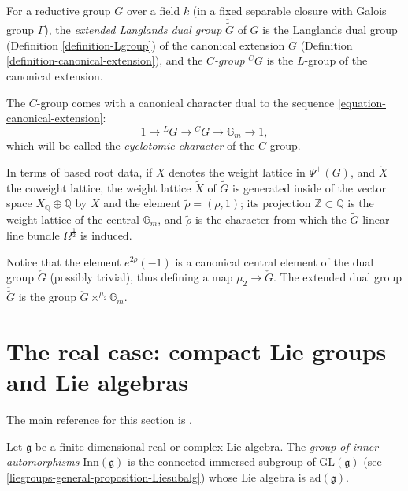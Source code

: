 \begin{definition}
 \label{definition-C-group}
For a reductive group $G$ over a field $k$ (in a fixed separable closure with Galois group $\Gamma$), the {\it extended Langlands dual group} $\check{\tilde G}$ of $G$ is the Langlands dual group (Definition \ref{definition-Lgroup}) of the canonical extension $\tilde G$ (Definition \ref{definition-canonical-extension}), and the {\it $C$-group} ${^CG}$ is the $L$-group of the canonical extension. 

The $C$-group comes with a canonical character dual to the sequence \eqref{equation-canonical-extension}:
\begin{equation}
\label{equation-cyclotomic-character} 
1\to {^LG} \to {^CG} \to \mathbb G_m \to 1,
\end{equation}
which will be called the {\it cyclotomic character} of the $C$-group.
\end{definition}

\begin{remark}
 \label{remark-Cgroup-rootdata}
In terms of based root data, if $X$ denotes the weight lattice in $\Psi^+(G)$, and $\check X$ the coweight lattice, the weight lattice $\tilde X$ of $\tilde G$ is generated inside of the vector space $X_{\mathbb Q} \oplus \mathbb Q$ by $X$ and the element $\tilde\rho = (\rho, 1)$; its projection $\mathbb Z\subset \mathbb Q$ is the weight lattice of the central $\mathbb G_m$, and $\tilde\rho$ is the character from which the $\tilde G$-linear line bundle $\Omega^\frac{1}{2}$ is induced. 

Notice that the element $e^{2\rho}(-1)$ is a canonical central element of the dual group $\check G$ (possibly trivial), thus defining a map $\mu_2\to \check G$. The extended dual group $\check{\tilde G}$ is the group $\check G \times^{\mu_2} \mathbb G_m$. 
\end{remark}





\section{The real case: compact Lie groups and Lie algebras}
\label{section-real-compact}

The main reference for this section is \cite[Ch.\ IX \S 1]{Bourbaki-Lie}.

\begin{definition}
 \label{definition-Inng}
Let $\mathfrak g$ be a finite-dimensional real or complex Lie algebra. The {\it group of inner automorphisms} $\text{Inn}(\mathfrak g)$ is the connected immersed subgroup of $\text{GL}(\mathfrak g)$ (see \ref{liegroups-general-proposition-Liesubalg}) whose Lie algebra is $\text{ad}(\mathfrak g)$.
\end{definition}

